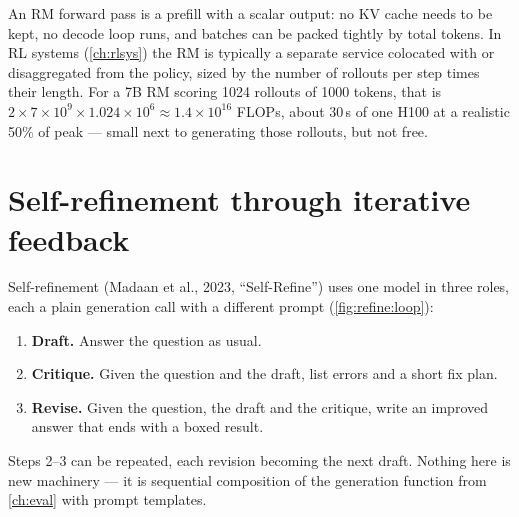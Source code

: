 \begin{systemslens}
An RM forward pass is a prefill with a scalar output: no KV cache needs to be kept, no decode loop
runs, and batches can be packed tightly by total tokens. In RL systems (\cref{ch:rlsys}) the RM is
typically a separate service colocated with or disaggregated from the policy, sized by the number of
rollouts per step times their length. For a 7B RM scoring 1024 rollouts of 1000 tokens, that is
$2 \times 7\times10^9 \times 1.024\times10^6 \approx 1.4\times10^{16}$ FLOPs, about 30\,s of one
H100 at a realistic 50\% of peak --- small next to generating those rollouts, but not free.
\end{systemslens}

\section{Self-refinement through iterative feedback}\label{sec:refine:selfrefine}


Self-refinement (Madaan et al., 2023, ``Self-Refine'') uses one model in three roles, each a plain
generation call with a different prompt (\cref{fig:refine:loop}):
\begin{enumerate}
  \item \textbf{Draft.} Answer the question as usual.
  \item \textbf{Critique.} Given the question and the draft, list errors and a short fix plan.
  \item \textbf{Revise.} Given the question, the draft and the critique, write an improved answer
  that ends with a boxed result.
\end{enumerate}
Steps 2--3 can be repeated, each revision becoming the next draft. Nothing here is new machinery ---
it is sequential composition of the generation function from \cref{ch:eval} with prompt templates.

